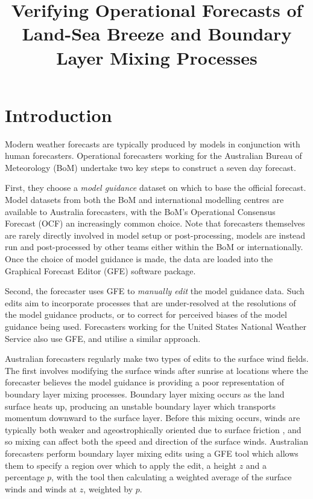 \documentclass[twocol]{ametsoc}
\title{Verifying Operational Forecasts of Land-Sea Breeze and Boundary Layer Mixing Processes}
\affiliation{School of Earth Sciences, and ARC Centre of Excellence for Climate Extremes, The University of Melbourne, Melbourne, Victoria, Australia.}
\begin{document}
\maketitle

\section{Introduction}
\label{Sec:Introduction}
Modern weather forecasts are typically produced by models in conjunction with human forecasters. Operational forecasters working for the Australian Bureau of Meteorology (BoM) undertake two key steps to construct a seven day forecast. 

First, they choose a \textit{model guidance} dataset on which to base the official forecast. Model datasets from both the BoM and international modelling centres are available to Australia forecasters, with the BoM's Operational Consensus Forecast (OCF) an increasingly common choice. Note that forecasters themselves are rarely directly involved in model setup or post-processing, models are instead run and post-processed by other teams either within the BoM or internationally. Once the choice of model guidance is made, the data are loaded into the Graphical Forecast Editor (GFE) software package. 

Second, the forecaster uses GFE to \textit{manually edit} the model guidance data. Such edits aim to incorporate processes that are under-resolved at the resolutions of the model guidance products, or to correct for perceived biases of the model guidance being used. Forecasters working for the United States National Weather Service also use GFE, and utilise a similar approach. 

Australian forecasters regularly make two types of edits to the surface wind fields. The first involves modifying the surface winds after sunrise at locations where the forecaster believes the model guidance is providing a poor representation of boundary layer mixing processes. Boundary layer mixing occurs as the land surface heats up, producing an unstable boundary layer which transports momentum downward to the surface layer. Before this mixing occurs, winds are typically both weaker and ageostrophically oriented due to surface friction \citep{lee18}, and so mixing can affect both the speed and direction of the surface winds. Australian forecasters perform boundary layer mixing edits using a GFE tool which allows them to specify a region over which to apply the edit, a height $z$ and a percentage $p$, with the tool then calculating a weighted average of the surface winds and winds at $z$, weighted by $p$.
\end{document}
